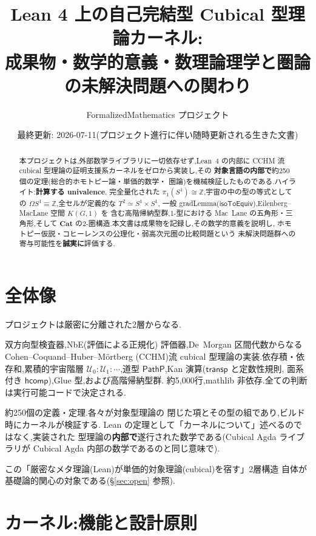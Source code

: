 \documentclass[11pt]{ltjsarticle}
\title{Lean 4 上の自己完結型 Cubical 型理論カーネル:\\
成果物・数学的意義・数理論理学と圏論の未解決問題への関わり}
\author{FormalizedMathematics プロジェクト}
\date{最終更新: 2026-07-11(プロジェクト進行に伴い随時更新される生きた文書)}
\newcommand{\Z}{\mathbb{Z}}
\newcommand{\U}{\mathcal{U}}
\newcommand{\op}[1]{\ensuremath{\mathsf{#1}}}
\begin{document}
\maketitle

\begin{abstract}
本プロジェクトは,外部数学ライブラリに一切依存せず,Lean~4 の内部に
CCHM 流 cubical 型理論の証明支援系カーネルをゼロから実装し,その
\textbf{対象言語の内部で}約250個の定理(総合的ホモトピー論・単価的数学・
圏論)を機械検証したものである.ハイライト:\textbf{計算する univalence},
完全量化された $\pi_1(S^1)\cong\Z$,宇宙の中の型の等式としての
$\Omega S^1\equiv\Z$,全セルが定義的な $T^2\simeq S^1\times S^1$,
一般 gradLemma($\op{isoToEquiv}$),Eilenberg--MacLane 空間 $K(G,1)$ を
含む高階帰納型群,1-型における Mac~Lane の五角形・三角形,そして
$\mathbf{Cat}$ の2-圏構造.本文書は成果物を記録し,その数学的意義を説明し,
ホモトピー仮説・コヒーレンスの公理化・弱高次元圏の比較問題という
未解決問題群への寄与可能性を\textbf{誠実に}評価する.
\end{abstract}

\tableofcontents

\section{全体像}

プロジェクトは厳密に分離された2層からなる.

\begin{description}[leftmargin=1.5em]
\item[カーネル(メタ理論,Lean~4)] 双方向型検査器,NbE(評価による正規化)
評価器,De~Morgan 区間代数からなる Cohen--Coquand--Huber--M\"ortberg
(CCHM)流 cubical 型理論の実装.依存積・依存和,累積的宇宙階層
$\U_0:\U_1:\cdots$,道型 $\op{PathP}$,Kan 演算($\op{transp}$ と定数性規則,
面系付き $\op{hcomp}$),Glue 型,および高階帰納型群.
約5{,}000行,mathlib 非依存.全ての判断は実行可能コードで決定される.
\item[ライブラリ(対象言語)] 約250個の定義・定理.各々が対象型理論の
閉じた項とその型の組であり,ビルド時にカーネルが検証する.
Lean の定理として「カーネルについて」述べるのではなく,実装された
型理論の\textbf{内部で}遂行された数学である(Cubical Agda ライブラリが
Cubical Agda 内部の数学であるのと同じ意味で).
\end{description}

この「厳密なメタ理論(Lean)が単価的対象理論(cubical)を宿す」2層構造
自体が基礎論的関心の対象である(\S\ref{sec:open} 参照).

\section{カーネル:機能と設計原則}
\end{document}
